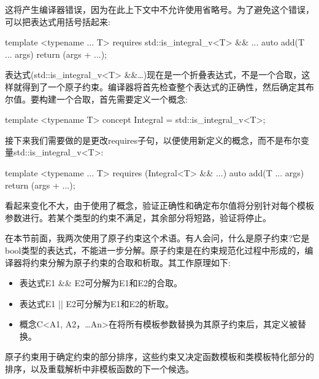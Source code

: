 这将产生编译器错误，因为在此上下文中不允许使用省略号。为了避免这个错误，可以把表达式用括号括起来:

\begin{cpp}
	template <typename ... T>
	requires std::is_integral_v<T> && ...
	auto add(T ... args)
	{
		return (args + ...);
	}
\end{cpp}

表达式(std::is\_integral\_v<T> \&\&…)现在是一个折叠表达式，不是一个合取，这样就得到了一个原子约束。编译器将首先检查整个表达式的正确性，然后确定其布尔值。要构建一个合取，首先需要定义一个概念:

\begin{cpp}
template <typename T>
concept Integral = std::is_integral_v<T>;
\end{cpp}

接下来我们需要做的是更改requires子句，以便使用新定义的概念，而不是布尔变量std::is\_integral\_v<T>:

\begin{cpp}
template <typename ... T>
requires (Integral<T> && ...)
auto add(T ... args)
{
	return (args + ...);
}
\end{cpp}

看起来变化不大，由于使用了概念，验证正确性和确定布尔值将分别针对每个模板参数进行。若某个类型的约束不满足，其余部分将短路，验证将停止。

在本节前面，我两次使用了原子约束这个术语。有人会问，什么是原子约束?它是bool类型的表达式，不能进一步分解。原子约束是在约束规范化过程中形成的，编译器将约束分解为原子约束的合取和析取。其工作原理如下:

\begin{itemize}
\item
表达式E1 \&\& E2可分解为E1和E2的合取。

\item
表达式E1 || E2可分解为E1和E2的析取。

\item
概念C<A1, A2，…An>在将所有模板参数替换为其原子约束后，其定义被替换。
\end{itemize}

原子约束用于确定约束的部分排序，这些约束又决定函数模板和类模板特化部分的排序，以及重载解析中非模板函数的下一个候选。











